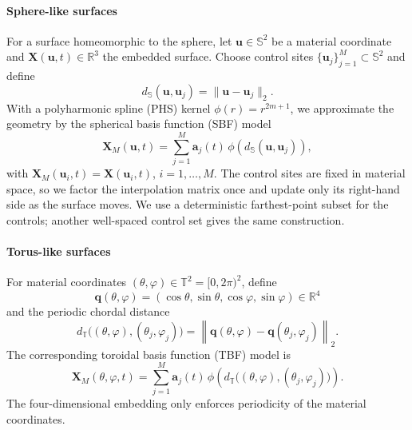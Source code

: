 \documentclass[a4paper,fleqn]{cas-sc}
\begin{document}
\paragraph{Sphere-like surfaces}
For a surface homeomorphic to the sphere, let $\bm u\in\mathbb S^2$ be a
material coordinate and $\bm X(\bm u,t)\in\mathbb R^3$ the embedded surface.
Choose control sites $\{\bm u_j\}_{j=1}^M\subset\mathbb S^2$ and define
\[
  d_{\mathbb S}(\bm u,\bm u_j)=\|\bm u-\bm u_j\|_2.
\]
With a polyharmonic spline (PHS) kernel $\phi(r)=r^{2m+1}$, we approximate the
geometry by the spherical basis function (SBF) model
\begin{equation}
  \bm X_M(\bm u,t)
  =
  \sum_{j=1}^M \bm a_j(t)\,
  \phi\!\left(d_{\mathbb S}(\bm u,\bm u_j)\right),
  \label{eq:spherical-sbf-geometry}
\end{equation}
with $
  \bm X_M(\bm u_i,t)=\bm X(\bm u_i,t)$, 
  $i=1,\ldots,M.$
The control sites are fixed in material space, so we factor the interpolation
matrix once and update only its right-hand side as the surface moves.  We use
a deterministic farthest-point subset for the controls; another well-spaced
control set gives the same construction.

\paragraph{Torus-like surfaces}
For material coordinates $(\theta,\varphi)\in\mathbb T^2=[0,2\pi)^2$, define
\[
  \bm q(\theta,\varphi)
  =
  (\cos\theta,\sin\theta,\cos\varphi,\sin\varphi)\in\mathbb R^4
\]
and the periodic chordal distance
\begin{equation}
  d_{\mathbb T}\bigl((\theta,\varphi),(\theta_j,\varphi_j)\bigr)
  =
  \left\|
    \bm q(\theta,\varphi)-\bm q(\theta_j,\varphi_j)
  \right\|_2.
  \label{eq:toroidal-distance}
\end{equation}
The corresponding toroidal basis function (TBF) model is
\begin{equation}
  \bm X_M(\theta,\varphi,t)
  =
  \sum_{j=1}^M \bm a_j(t)\,
  \phi\!\left(
    d_{\mathbb T}\bigl((\theta,\varphi),(\theta_j,\varphi_j)\bigr)
  \right).
  \label{eq:toroidal-basis-geometry}
\end{equation}
The four-dimensional embedding only enforces periodicity of the material
coordinates.
\end{document}
